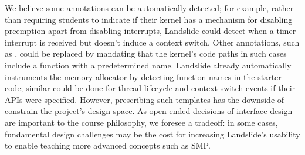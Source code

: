 We believe some annotations can be automatically detected;
for example, rather than requiring students to indicate if their kernel has a mechanism for disabling preemption apart from disabling interrupts, Landslide could detect when a timer interrupt is received but doesn't induce a context switch.
Other annotations, such as , could be replaced by mandating that the kernel's code paths in such cases include a function with a predetermined name.
Landslide already automatically instruments the memory allocator by detecting function names in the starter code; similar could be done for thread lifecycle and context switch events if their APIs were specified.
However, prescribing such templates has the downside of constrain the project's design space.
As open-ended decisions of interface design are important to the course philosophy, we foresee a tradeoff: in some cases, fundamental design challenges may be the cost for increasing Landslide's usability to enable teaching more advanced concepts such as SMP.





